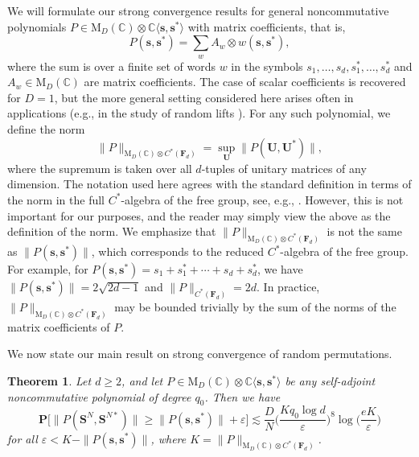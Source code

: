 \documentclass[10pt,reqno]{amsart}
\newtheorem{thm}{Theorem}[section]
\theoremstyle{definition}
\theoremstyle{remark}
\numberwithin{equation}{section}
\numberwithin{figure}{section}
\numberwithin{table}{section}
\begin{document}
We will formulate our strong convergence results for general 
noncommutative polynomials $P\in 
\mathrm{M}_D(\mathbb{C})\otimes \mathbb{C}\langle\boldsymbol{s},
\boldsymbol{s}^*\rangle$ with matrix coefficients, that is,
$$
	P(\boldsymbol{s},\boldsymbol{s}^*) =
	\sum_w A_w \otimes w(\boldsymbol{s},\boldsymbol{s}^*),
$$
where the sum is over a finite set of words $w$ in the symbols
$s_1,\ldots,s_d,s_1^*,\ldots,s_d^*$ and $A_w\in \mathrm{M}_D(\mathbb{C})$ 
are matrix coefficients. The case of scalar coefficients is recovered for
$D=1$, but the more general setting considered here arises often in 
applications (e.g., in the study of random lifts \cite{BC19}).
For any such polynomial, we define 
the norm
$$
	\|P\|_{\mathrm{M}_D(\mathbb{C})\otimes C^*(\mathbf{F}_d)} = 
	\sup_{\boldsymbol{U}} \|P(\boldsymbol{U},\boldsymbol{U}^*)\|,
$$
where the supremum is taken over all $d$-tuples of 
unitary matrices of any dimension. The notation used here agrees with the 
standard definition in terms of the norm in the full $C^*$-algebra of 
the free group, see, e.g., \cite[Theorem 7]{Cho80}.
However, this is not important for our purposes, and the reader may simply 
view the above as the definition of the norm. We emphasize that
$\|P\|_{\mathrm{M}_D(\mathbb{C})\otimes C^*(\mathbf{F}_d)}$ is not the 
same as $\|P(\boldsymbol{s},\boldsymbol{s}^*)\|$, which corresponds to the
reduced $C^*$-algebra of
the free group. For example, for $P(\boldsymbol{s},\boldsymbol{s}^*)=
s_1+s_1^*+\cdots+s_d+s_d^*$, we have 
$\|P(\boldsymbol{s},\boldsymbol{s}^*)\|=2\sqrt{2d-1}$ and
$\|P\|_{C^*(\mathbf{F}_d)} =2d$. In practice, 
$\|P\|_{\mathrm{M}_D(\mathbb{C})\otimes C^*(\mathbf{F}_d)}$ 
may be bounded
trivially by the sum of the norms of the matrix coefficients of $P$.

We now state our main result on strong convergence of random 
permutations.

\begin{thm}
\label{thm:strongperm}
Let $d\ge 2$, and let $P\in \mathrm{M}_D(\mathbb{C})
\otimes \mathbb{C}\langle\boldsymbol{s},\boldsymbol{s}^*\rangle$ be any 
self-adjoint noncommutative polynomial of degree $q_0$. Then we have
$$
	\mathbf{P}\big[\|P(\boldsymbol{S}^N,\boldsymbol{S}^{N*})\|\ge
	\|P(\boldsymbol{s},\boldsymbol{s}^*)\|+\varepsilon\big]
	\lesssim
	\frac{D}{N}
	\bigg(\frac{Kq_0\log d}{\varepsilon}\bigg)^{8}
	\log
	\bigg(\frac{eK}{\varepsilon}\bigg)
$$
for all $\varepsilon < K-\|P(\boldsymbol{s},\boldsymbol{s}^*)\|$,
where $K=\|P\|_{\mathrm{M}_D(\mathbb{C})\otimes C^*(\mathbf{F}_d)}$.
\end{thm}
\end{document}
